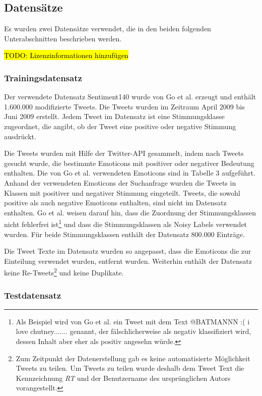 \documentclass[researchlab,group,]{AIGpaper}
\newcommand{\redhl}{\sethlcolor{red}\hl}
\begin{document}
\subsection{Datensätze}

Es wurden zwei Datensätze verwendet, die in den beiden folgenden Unterabschnitten beschrieben werden.

\redhl{TODO: Lizenzinformationen hinzufügen}

\subsubsection{Trainingsdatensatz}
Der verwendete Datensatz \glqq Sentiment140\grqq{} wurde von Go et al. \cite{go2009twitter} erzeugt und enthält 1.600.000 modifizierte Tweets.
Die Tweets wurden im Zeitraum April 2009 bis Juni 2009 erstellt.
Jedem Tweet im Datensatz ist eine Stimmungsklasse zugeordnet, die angibt, ob der Tweet eine positive oder negative Stimmung ausdrückt.

Die Tweets wurden mit Hilfe der Twitter-API gesammelt, indem nach Tweets gesucht wurde, die bestimmte Emoticons mit positiver oder negativer Bedeutung enthalten.
Die von Go et al. verwendeten Emoticons sind in Tabelle 3 \cite[S. 4]{go2009twitter} aufgeführt.
Anhand der verwendeten Emoticons der Suchanfrage wurden die Tweets in Klassen mit positiver und negativer Stimmung eingeteilt.
Tweets, die sowohl positive als auch negative Emoticons enthalten, sind nicht im Datensatz enthalten.
Go et al. \cite{go2009twitter} weisen darauf hin, dass die Zuordnung der Stimmungsklassen nicht fehlerfrei ist\footnote{
    Als Beispiel wird von Go et al. \cite{go2009twitter} ein Tweet mit dem Text \glqq @BATMANNN :( i love chutney.......\grqq{} genannt, der fälschlicherweise als negativ klassifiziert wird, dessen Inhalt aber eher als positiv angesehn würde.
} und dass die Stimmungsklassen als Noisy Labels verwendet wurden.
Für beide Stimmungsklassen enthält der Datensatz 800.000 Einträge.

Die Tweet Texte im Datensatz wurden so angepasst, dass die Emoticons die zur Einteilung verwendet wurden, entfernt wurden.
Weiterhin enthält der Datensatz keine Re-Tweets\footnote{
    Zum Zeitpunkt der Datenerstellung gab es keine automatisierte Möglichkeit Tweets zu teilen.
    Um Tweets zu teilen wurde deshalb dem Tweet Text die Kennzeichnung \textit{RT} und der Benutzername des ursprünglichen Autors vorangestellt.
} und keine Duplikate.

\subsubsection{Testdatensatz}
\end{document}
